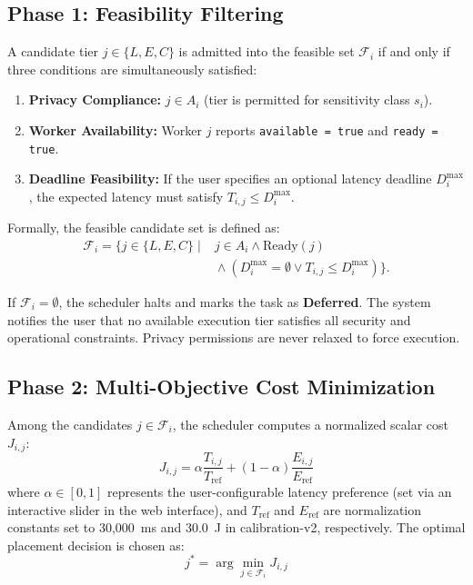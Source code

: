 \documentclass[conference]{IEEEtran}
\begin{document}
\subsection{Phase 1: Feasibility Filtering}
A candidate tier $j \in \{L,E,C\}$ is admitted into the feasible set $\mathcal{F}_i$ if and only if three conditions are simultaneously satisfied:
\begin{enumerate}
  \item \textbf{Privacy Compliance:} $j \in A_i$ (tier is permitted for sensitivity class $s_i$).
  \item \textbf{Worker Availability:} Worker $j$ reports \texttt{available = true} and \texttt{ready = true}.
  \item \textbf{Deadline Feasibility:} If the user specifies an optional latency deadline $D^{\max}_i$, the expected latency must satisfy $T_{i,j} \le D^{\max}_i$.
\end{enumerate}

Formally, the feasible candidate set is defined as:
\begin{equation}
  \begin{aligned}
  \mathcal{F}_i = \{j \in \{L,E,C\}\mid {}&j \in A_i \land \text{Ready}(j)\\
    &{}\land (D^{\max}_i=\emptyset \lor T_{i,j}\le D^{\max}_i)\}.
  \end{aligned}
\end{equation}

If $\mathcal{F}_i = \emptyset$, the scheduler halts and marks the task as \textbf{Deferred}.
The system notifies the user that no available execution tier satisfies all security and operational constraints.
Privacy permissions are never relaxed to force execution.

\subsection{Phase 2: Multi-Objective Cost Minimization}
Among the candidates $j \in \mathcal{F}_i$, the scheduler computes a normalized scalar cost $J_{i,j}$:
\begin{equation}
  J_{i,j} = \alpha \frac{T_{i,j}}{T_{\text{ref}}} + (1 - \alpha) \frac{E_{i,j}}{E_{\text{ref}}}
\end{equation}
where $\alpha \in [0,1]$ represents the user-configurable latency preference (set via an interactive slider in the web interface), and $T_{\text{ref}}$ and $E_{\text{ref}}$ are normalization constants set to 30,000~ms and 30.0~J in calibration-v2, respectively.
The optimal placement decision is chosen as:
\begin{equation}
  j^* = \arg\min_{j \in \mathcal{F}_i} J_{i,j}
\end{equation}
\end{document}
